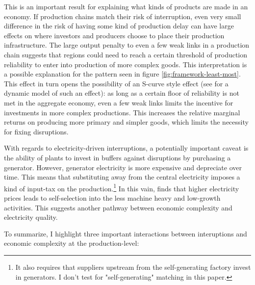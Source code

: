 \documentclass[11pt]{article}
\begin{document}
  This is an important result for explaining what kinds of products are made in an economy. If production chains match their risk of interruption, even very small difference in the risk of having some kind of production delay can have large effects on where investors and producers choose to place their production infrastructure. The large output penalty to even a few weak links in a production chain suggests that regions could need to reach a certain threshold of production reliability to enter into production of more complex goods. This interpretation is a possible explanation for the pattern seen in figure \ref{fig:framework-least-most}. This effect in turn opens the possibility of an S-curve style effect (see \cite{brummitt_contagious_2017} for a dynamic model of such an effect): as long as a certain floor of reliability is not met in the aggregate economy, even a few weak links limits the incentive for investments in more complex productions. This increases the relative marginal returns on producing more primary and simpler goods, which limits the necessity for fixing disruptions.

With regards to electricity-driven interruptions, a potentially important caveat is the ability of plants to invest in buffers against disruptions by purchasing a generator. However, generator electricity is more expensive and depreciate over time. This means that substituting away from the central electricity imposes a kind of input-tax on the production.\footnote{It also requires that suppliers upstream from the self-generating factory invest in generators. I don't test for "self-generating" matching in this paper.} In this vain, \cite{abeberese_electricity_2017} finds that higher electricity prices leads to self-selection into the less machine heavy and low-growth activities. This suggests another pathway between economic complexity and electricity quality. 

To summarize, I highlight three important interactions between interuptions and economic complexity at the production-level:
\end{document}
